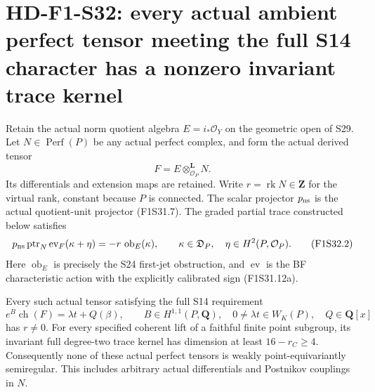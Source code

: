 \section[HD-F1-S32: arbitrary ambient perfect tensors]{HD-F1-S32: every actual ambient perfect tensor meeting the full S14 character has a nonzero invariant trace kernel}
\label{sec:f1-norm-fourfold-perfect-tensor}

Retain the actual norm quotient algebra
$E=i_*\mathcal O_Y$ on the geometric open of S29.
Let $N\in\operatorname{Perf}(P)$ be any actual perfect
complex, and form the actual derived tensor
\[
             F=E\otimes^{\mathbf L}_{\mathcal O_P}N.
 \tag{F1S32.1}
\]
Its differentials and extension maps are retained.
Write $r=\operatorname{rk}N\in\mathbf Z$ for the
virtual rank, constant because $P$ is connected.
The scalar projector $p_{\rm ns}$ is the actual
quotient-unit projector (F1S31.7).
The graded partial trace constructed below satisfies
\[
 p_{\rm ns}\operatorname{ptr}_N
           \operatorname{ev}_F(\kappa+\eta)
        =-r\,\operatorname{ob}_E(\kappa),
 \qquad
 \kappa\in\mathfrak D_P,\quad
 \eta\in H^2(P,\mathcal O_P).
 \tag{F1S32.2}
\]
Here $\operatorname{ob}_E$ is precisely the S24
first-jet obstruction, and $\operatorname{ev}$ is
the BF characteristic action with the explicitly
calibrated sign (F1S31.12a).

Every such actual tensor satisfying the full S14
requirement
\[
 e^B\operatorname{ch}(F)=\lambda t+Q(\beta),\qquad
 B\in H^{1,1}(P,\mathbf Q),\quad
 0\ne\lambda t\in W_K(P),\quad Q\in\mathbf Q[x]
 \tag{F1S32.3}
\]
has $r\ne0$. For every specified coherent lift of
a faithful finite point subgroup, its invariant
full degree-two trace kernel has dimension at least
$16-r_C\ge4$. Consequently none of these actual
perfect tensors is weakly point-equivariantly
semiregular. This includes arbitrary actual
differentials and Postnikov couplings in $N$.

